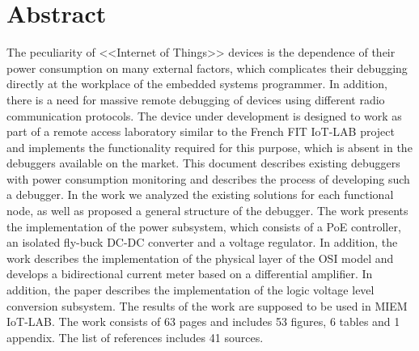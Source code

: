 \chapter*{Abstract}
\hspace{1cm}

The peculiarity of <<Internet of Things>> devices is the dependence of their power consumption 
on many external factors, which complicates their debugging directly at the workplace of the 
embedded systems programmer.
In addition, there is a need for massive remote debugging of devices using different 
radio communication protocols.
The device under development is designed to work as part of a remote access laboratory 
similar to the French FIT IoT-LAB project and implements the functionality required for 
this purpose, which is absent in the debuggers available on the market.
This document describes existing debuggers with power consumption monitoring and describes 
the process of developing such a debugger. 
In the work we analyzed the existing solutions for each functional node, as well as 
proposed a general structure of the debugger.
The work presents the implementation of the power subsystem, which consists of a PoE controller, 
an isolated fly-buck DC-DC converter and a voltage regulator.
In addition, the work describes the implementation of the physical layer of the OSI model and 
develops a bidirectional current meter based on a differential amplifier.
In addition, the paper describes the implementation of the logic voltage level conversion subsystem.
The results of the work are supposed to be used in MIEM IoT-LAB.
The work consists of 63 pages and includes 53 figures, 6 tables and 1 appendix.
The list of references includes 41 sources.

